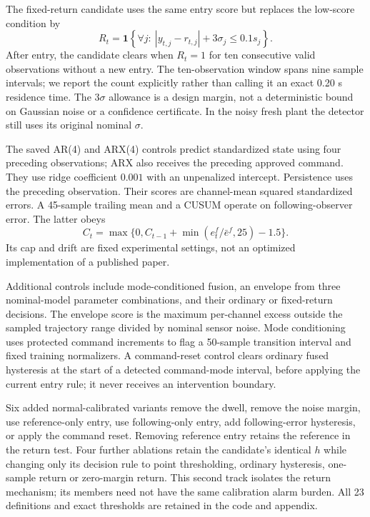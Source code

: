 The fixed-return candidate uses the same entry score but replaces the low-score condition by
\begin{equation}\label{eq:return}
 R_t=\mathbf 1\!\left\{\forall j:\ |y_{t,j}-r_{t,j}|+3\sigma_j\le0.1s_j\right\}.
\end{equation}
After entry, the candidate clears when $R_t=1$ for ten consecutive valid observations without a new entry. The ten-observation window spans nine sample intervals; we report the count explicitly rather than calling it an exact 0.20 s residence time. The $3\sigma$ allowance is a design margin, not a deterministic bound on Gaussian noise or a confidence certificate. In the noisy fresh plant the detector still uses its original nominal $\sigma$.

The saved AR(4) and ARX(4) controls predict standardized state using four preceding observations; ARX also receives the preceding approved command. They use ridge coefficient $0.001$ with an unpenalized intercept. Persistence uses the preceding observation. Their scores are channel-mean squared standardized errors. A 45-sample trailing mean and a CUSUM operate on following-observer error. The latter obeys
\begin{equation}
 C_t=\max\{0,C_{t-1}+\min(e_t^f/\bar e^f,25)-1.5\}.
\end{equation}
Its cap and drift are fixed experimental settings, not an optimized implementation of a published paper.

Additional controls include mode-conditioned fusion, an envelope from three nominal-model parameter combinations, and their ordinary or fixed-return decisions. The envelope score is the maximum per-channel excess outside the sampled trajectory range divided by nominal sensor noise. Mode conditioning uses protected command increments to flag a 50-sample transition interval and fixed training normalizers. A command-reset control clears ordinary fused hysteresis at the start of a detected command-mode interval, before applying the current entry rule; it never receives an intervention boundary.

Six added normal-calibrated variants remove the dwell, remove the noise margin, use reference-only entry, use following-only entry, add following-error hysteresis, or apply the command reset. Removing reference entry retains the reference in the return test. Four further ablations retain the candidate's identical $h$ while changing only its decision rule to point thresholding, ordinary hysteresis, one-sample return or zero-margin return. This second track isolates the return mechanism; its members need not have the same calibration alarm burden. All 23 definitions and exact thresholds are retained in the code and appendix.
